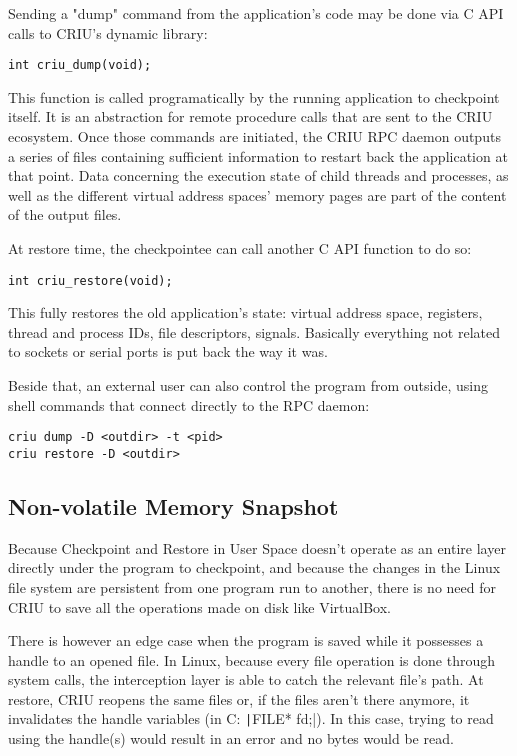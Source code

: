 Sending a "dump" command from the application's code may be done via C API calls to CRIU's dynamic library:
\begin{verbatim}
int criu_dump(void);
\end{verbatim}
This function is called programatically by the running application to checkpoint itself. It is an abstraction for remote procedure calls that are sent to the CRIU ecosystem. Once those commands are initiated, the \gls{CRIU} RPC daemon outputs a series of files containing sufficient information to restart back the application at that point. Data concerning the execution state of child threads and processes, as well as the different virtual address spaces' memory pages are part of the content of the output files.

At restore time, the checkpointee can call another C API function to do so: 
\begin{verbatim}
int criu_restore(void);
\end{verbatim}
This fully restores the old application's state: virtual address space, registers, thread and process IDs, file descriptors, signals. Basically everything not related to sockets or serial ports is put back the way it was.

Beside that, an external user can also control the program from outside, using shell commands that connect directly to the RPC daemon:
\begin{verbatim}
criu dump -D <outdir> -t <pid>
criu restore -D <outdir>
\end{verbatim}

\subsection*{Non-volatile Memory Snapshot}
Because Checkpoint and Restore in User Space doesn't operate as an entire layer directly under the program to checkpoint, and because the changes in the Linux file system are persistent from one program run to another, there is no need for CRIU to save all the operations made on disk like VirtualBox. 

There is however an edge case when the program is saved while it possesses a handle to an opened file. In Linux, because every file operation is done through system calls, the interception layer is able to catch the relevant file's path. At restore, CRIU reopens the same files or, if the files aren't there anymore, it invalidates the handle variables (in C: \texttt|FILE* fd;|). In this case, trying to read using the handle(s) would result in an error and no bytes would be read.

